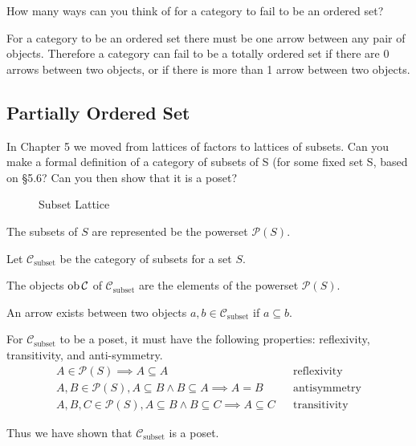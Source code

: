 \begin{ttta}
How many ways can you think of for a category to fail to be an
ordered set?
\end{ttta}
\begin{proofitem}
\item For a category to be an ordered set there must be one arrow between any
    pair of objects. Therefore a category can fail to be a totally ordered set
    if there are 0 arrows between two objects, or if there is more than 1 arrow
    between two objects.
\end{proofitem}

\subsection{Partially Ordered Set}
\setcounter{tttacounter}{6}
\begin{ttta}
In Chapter 5 we moved from lattices of factors to lattices of subsets.
Can you make a formal definition of a category of subsets of S (for some fixed
set S, based on \S 5.6? Can you then show that it is a poset?
\end{ttta}
\begin{figure}[H]
    \begin{center}

\end{center}
\caption{Subset Lattice}
\end{figure}
\begin{proofitem}
\item The subsets of $S$ are represented be the powerset $\mathscr{P}(S)$.
\item Let $\mathcal{C}_\text{subset}$ be the category of subsets for a set $S$.
\item The objects $\text{ob}\thinspace\mathcal{C}{}$ of $\mathcal{C}_\text{subset}$ are the elements of
    the powerset $\mathscr{P}(S)$.
\item An arrow exists between two objects $a, b \in \mathcal{C}_\text{subset}$
    if $a\subseteq b$.
\item For $\mathcal{C}_\text{subset}$ to be a poset, it must have the following
    properties: reflexivity, transitivity, and anti-symmetry.
\setcounter{equation}{0}
\begin{align}
    A \in \mathscr{P}(S) \implies A\subseteq A &&\text{reflexivity}\\
    A,B \in \mathscr{P}(S), A\subseteq B \land B \subseteq A \implies A=B  &&\text{antisymmetry}\\
    A,B,C \in \mathscr{P}(S), A \subseteq B \land B \subseteq C \implies A
    \subseteq C&&\text{transitivity}
\end{align}
\item Thus we have shown that $\mathcal{C}_\text{subset}$ is a poset.
\end{proofitem}
